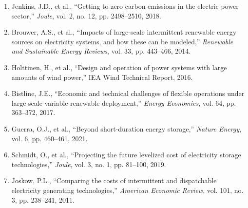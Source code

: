 \documentclass[11pt,a4paper]{article}
\begin{document}
\begin{enumerate}
\item Jenkins, J.D., et al., ``Getting to zero carbon emissions in the electric power sector,''
\textit{Joule}, vol. 2, no. 12, pp. 2498--2510, 2018.

\item Brouwer, A.S., et al., ``Impacts of large-scale intermittent renewable energy sources on
electricity systems, and how these can be modeled,'' \textit{Renewable and Sustainable Energy
Reviews}, vol. 33, pp. 443--466, 2014.

\item Holttinen, H., et al., ``Design and operation of power systems with large amounts of wind
power,'' IEA Wind Technical Report, 2016.

\item Bistline, J.E., ``Economic and technical challenges of flexible operations under large-scale
variable renewable deployment,'' \textit{Energy Economics}, vol. 64, pp. 363--372, 2017.

\item Guerra, O.J., et al., ``Beyond short-duration energy storage,'' \textit{Nature Energy},
vol. 6, pp. 460--461, 2021.

\item Schmidt, O., et al., ``Projecting the future levelized cost of electricity storage
technologies,'' \textit{Joule}, vol. 3, no. 1, pp. 81--100, 2019.

\item Joskow, P.L., ``Comparing the costs of intermittent and dispatchable electricity generating
technologies,'' \textit{American Economic Review}, vol. 101, no. 3, pp. 238--241, 2011.
\end{enumerate}
\end{document}
